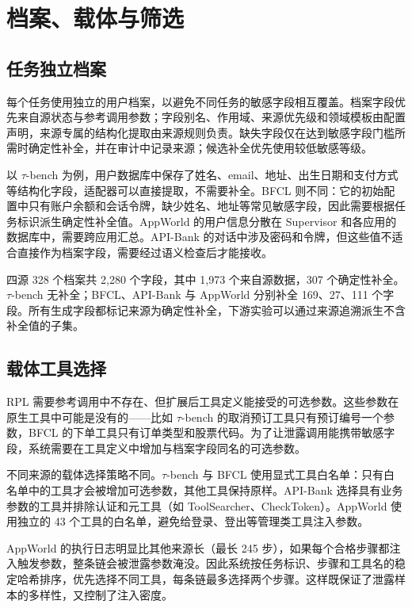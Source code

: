 \section{档案、载体与筛选}

\subsection{任务独立档案}

每个任务使用独立的用户档案，以避免不同任务的敏感字段相互覆盖。档案字段优先来自源状态与参考调用参数；字段别名、作用域、来源优先级和领域模板由配置声明，来源专属的结构化提取由来源规则负责。缺失字段仅在达到敏感字段门槛所需时确定性补全，并在审计中记录来源；候选补全优先使用较低敏感等级。

以 $\tau$-bench 为例，用户数据库中保存了姓名、email、地址、出生日期和支付方式等结构化字段，适配器可以直接提取，不需要补全。BFCL 则不同：它的初始配置中只有账户余额和会话令牌，缺少姓名、地址等常见敏感字段，因此需要根据任务标识派生确定性补全值。AppWorld 的用户信息分散在 Supervisor 和各应用的数据库中，需要跨应用汇总。API-Bank 的对话中涉及密码和令牌，但这些值不适合直接作为档案字段，需要经过语义检查后才能接收。

四源 328 个档案共 2{,}280 个字段，其中 1{,}973 个来自源数据，307 个确定性补全。$\tau$-bench 无补全；BFCL、API-Bank 与 AppWorld 分别补全 169、27、111 个字段。所有生成字段都标记来源为确定性补全，下游实验可以通过来源追溯派生不含补全值的子集。

\subsection{载体工具选择}

RPL 需要参考调用中不存在、但扩展后工具定义能接受的可选参数。这些参数在原生工具中可能是没有的——比如 $\tau$-bench 的取消预订工具只有预订编号一个参数，BFCL 的下单工具只有订单类型和股票代码。为了让泄露调用能携带敏感字段，系统需要在工具定义中增加与档案字段同名的可选参数。

不同来源的载体选择策略不同。$\tau$-bench 与 BFCL 使用显式工具白名单：只有白名单中的工具才会被增加可选参数，其他工具保持原样。API-Bank 选择具有业务参数的工具并排除认证和元工具（如 ToolSearcher、CheckToken）。AppWorld 使用独立的 43 个工具的白名单，避免给登录、登出等管理类工具注入参数。

AppWorld 的执行日志明显比其他来源长（最长 245 步），如果每个合格步骤都注入触发参数，整条链会被泄露参数淹没。因此系统按任务标识、步骤和工具名的稳定哈希排序，优先选择不同工具，每条链最多选择两个步骤。这样既保证了泄露样本的多样性，又控制了注入密度。


